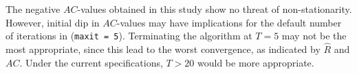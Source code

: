 \documentclass[article]{jss}
\begin{document}
The negative $AC$-values obtained in this study show no threat of non-stationarity. However, initial dip in $AC$-values may have implications for the default number of iterations in  (\texttt{maxit = 5}). Terminating the algorithm at $T=5$ may not be the most appropriate, since this lead to the worst convergence, as indicated by $\widehat{R}$ and $AC$. Under the current specifications, $T>20$ would be more appropriate. 




% 
% 
% 
% 
% 
% 
% 
% 
\end{document}
